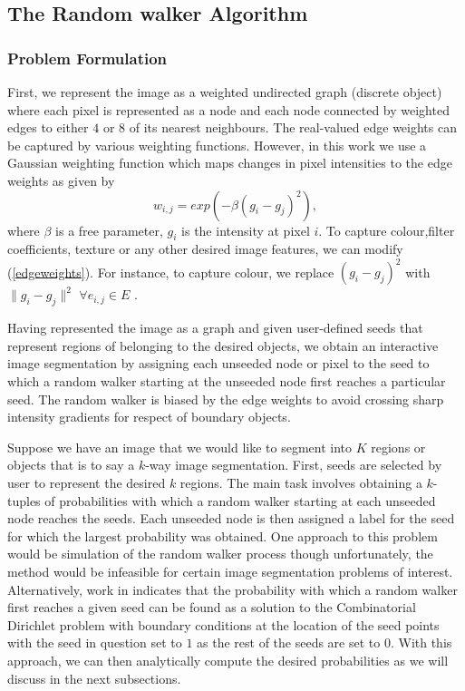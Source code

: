 \documentclass[10pt,a4paper]{article}
\begin{document}
\subsection{The Random walker Algorithm}
\subsubsection{Problem Formulation}
First, we represent the image as a weighted undirected graph (discrete object) where each pixel is represented as a node and each node connected by weighted edges to either $4$ or $8$ of its nearest neighbours. The real-valued edge weights can be captured by various weighting functions. However, in this work we use a Gaussian weighting function which maps changes in pixel intensities to  the edge weights as given by
\begin{equation}
w_{i,j} = exp(-\beta (g_i -g_j)^2),
\label{edgeweights}
\end{equation}
where $\beta$ is a free parameter, $g_i$ is the intensity at pixel $i$.
To capture colour,filter coefficients, texture or any other desired image features, we can modify (\ref{edgeweights}). For instance, to capture colour, we replace $(g_i -g_j)^2$ with $\|g_i -g_j\|^2$  $ \forall e_{i,j} \in E$ \citep{grady2006random}.

Having represented the image as a graph and given user-defined seeds that represent regions of belonging to the desired objects, we obtain an interactive image segmentation by assigning each unseeded node or pixel to the seed to which a random walker starting at the unseeded node first reaches a particular seed. The random walker is biased by the edge weights to avoid crossing sharp intensity gradients for respect of boundary objects.

Suppose we have an image that we would like to segment into $K$ regions or objects that is to say a $k$-way image segmentation.
First, seeds are selected by user to represent the desired $k$ regions. The main task involves obtaining a $k$-tuples of probabilities with which a random walker starting at each unseeded node reaches the seeds. Each unseeded node is then assigned a label for the seed for which the largest probability was obtained. One approach to this problem would be simulation of the random walker process though unfortunately, the method would be infeasible for certain image segmentation problems of interest. Alternatively, work in \citep{grady2006random} indicates that the probability with which a random walker first reaches a given seed can be found as a solution to the Combinatorial Dirichlet problem  with boundary conditions at the location of the seed points with the seed in question set to $1$ as the rest of the seeds are set to $0$. With this approach, we can then analytically compute the desired probabilities as we will discuss in the next subsections. 
\end{document}
